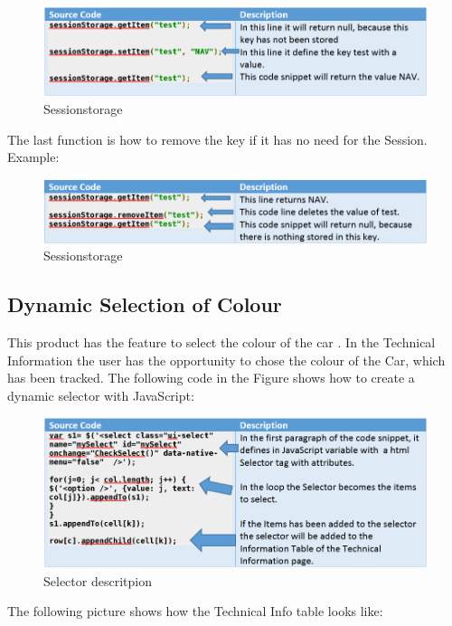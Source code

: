 \begin{figure}[h]
\centering
\includegraphics[width=1.0\linewidth]{graphics/sessionstorage2.PNG}
\caption{Sessionstorage}
\end{figure}

The last function is how to remove the key if it has no need for the Session. Example:
\begin{figure}[h]
\centering
\includegraphics[width=1.0\linewidth]{graphics/sessionstorage3.PNG}
\caption{Sessionstorage}
\end{figure}

\subsection{Dynamic Selection of Colour}
This product has the feature to select the colour of the car . In the Technical Information the user has the opportunity to chose the colour of the Car, which has been tracked. The following code in the Figure shows how to create a dynamic selector with JavaScript:

\begin{figure}[h]
\centering
\includegraphics[width=1.0\linewidth]{graphics/Sessionstorage41.PNG}
\caption{Selector descritpion}
\end{figure}

\clearpage
The following picture shows how the Technical Info table looks like:

